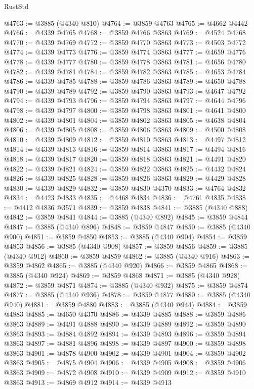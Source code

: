 \begin{lexlean}{RustStd}
\begin{coremodule}
@4763 := @3885 (@4340 @810)
@4764 := @3859 @4763
@4765 := @4662 @4442
@4766 := @4339 @4765
@4768 := @3859 @4766 @3863
@4769 := @4524 @4768
@4770 := @4339 @4769
@4772 := @3859 @4770 @3863
@4773 := @4503 @4772
@4774 := @4339 @4773
@4776 := @3859 @4774 @3863
@4777 := @4659 @4776
@4778 := @4339 @4777
@4780 := @3859 @4778 @3863
@4781 := @4656 @4780
@4782 := @4339 @4781
@4784 := @3859 @4782 @3863
@4785 := @4653 @4784
@4786 := @4339 @4785
@4788 := @3859 @4786 @3863
@4789 := @4650 @4788
@4790 := @4339 @4789
@4792 := @3859 @4790 @3863
@4793 := @4647 @4792
@4794 := @4339 @4793
@4796 := @3859 @4794 @3863
@4797 := @4644 @4796
@4798 := @4339 @4797
@4800 := @3859 @4798 @3863
@4801 := @4641 @4800
@4802 := @4339 @4801
@4804 := @3859 @4802 @3863
@4805 := @4638 @4804
@4806 := @4339 @4805
@4808 := @3859 @4806 @3863
@4809 := @4500 @4808
@4810 := @4339 @4809
@4812 := @3859 @4810 @3863
@4813 := @4497 @4812
@4814 := @4339 @4813
@4816 := @3859 @4814 @3863
@4817 := @4494 @4816
@4818 := @4339 @4817
@4820 := @3859 @4818 @3863
@4821 := @4491 @4820
@4822 := @4339 @4821
@4824 := @3859 @4822 @3863
@4825 := @4432 @4824
@4826 := @4339 @4825
@4828 := @3859 @4826 @3863
@4829 := @4429 @4828
@4830 := @4339 @4829
@4832 := @3859 @4830 @4370
@4833 := @4764 @4832
@4834 := @4423 @4833
@4835 := @4468 @4834
@4836 := @4761 @4835
@4838 := @4412 @4836 @3571
@4839 := @3859 @4838
@4841 := @3885 (@4340 @888)
@4842 := @3859 @4841
@4844 := @3885 (@4340 @892)
@4845 := @3859 @4844
@4847 := @3885 (@4340 @896)
@4848 := @3859 @4847
@4850 := @3885 (@4340 @900)
@4851 := @3859 @4850
@4853 := @3885 (@4340 @904)
@4854 := @3859 @4853
@4856 := @3885 (@4340 @908)
@4857 := @3859 @4856
@4859 := @3885 (@4340 @912)
@4860 := @3859 @4859
@4862 := @3885 (@4340 @916)
@4863 := @3859 @4862
@4865 := @3885 (@4340 @920)
@4866 := @3859 @4865
@4868 := @3885 (@4340 @924)
@4869 := @3859 @4868
@4871 := @3885 (@4340 @928)
@4872 := @3859 @4871
@4874 := @3885 (@4340 @932)
@4875 := @3859 @4874
@4877 := @3885 (@4340 @936)
@4878 := @3859 @4877
@4880 := @3885 (@4340 @940)
@4881 := @3859 @4880
@4883 := @3885 (@4340 @944)
@4884 := @3859 @4883
@4885 := @4650 @4370
@4886 := @4339 @4885
@4888 := @3859 @4886 @3863
@4889 := @4491 @4888
@4890 := @4339 @4889
@4892 := @3859 @4890 @3863
@4893 := @4884 @4892
@4894 := @4339 @4893
@4896 := @3859 @4894 @3863
@4897 := @4881 @4896
@4898 := @4339 @4897
@4900 := @3859 @4898 @3863
@4901 := @4878 @4900
@4902 := @4339 @4901
@4904 := @3859 @4902 @3863
@4905 := @4875 @4904
@4906 := @4339 @4905
@4908 := @3859 @4906 @3863
@4909 := @4872 @4908
@4910 := @4339 @4909
@4912 := @3859 @4910 @3863
@4913 := @4869 @4912
@4914 := @4339 @4913

\end{coremodule}
\end{lexlean}
